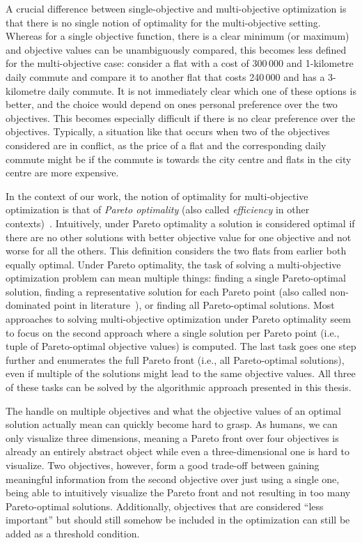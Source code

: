 A crucial difference between single-objective and multi-objective optimization is that there is no single notion of optimality for the multi-objective setting.
Whereas for a single objective function, there is a clear minimum (or maximum) and objective values can be unambiguously compared, this becomes less defined for the multi-objective case:
consider a flat with a cost of 300\,000 \texteuro{} and 1-kilometre daily commute and compare it to another flat that costs 240\,000 \texteuro{} and has a 3-kilometre daily commute.
It is not immediately clear which one of these options is better, and the choice would depend on ones personal preference over the two objectives.
This becomes especially difficult if there is no clear preference over the objectives.
Typically, a situation like that occurs when two of the objectives considered are in conflict, as the price of a flat and the corresponding daily commute might be if the commute is towards the city centre and flats in the city centre are more expensive.

In the context of our work, the notion of optimality for multi-objective optimization is that of \emph{Pareto optimality} (also called \emph{efficiency} in other contexts)~\autocite{Ehrgott2005-2}.
Intuitively, under Pareto optimality a solution is considered optimal if there are no other solutions with better objective value for one objective and not worse for all the others. 
This definition considers the two flats from earlier both equally optimal.
Under Pareto optimality, the task of solving a multi-objective optimization problem can mean multiple things:
finding a single Pareto-optimal solution, finding a representative solution for each Pareto point (also called non-dominated point in literature~\autocite{Ehrgott2005-2}), or finding all Pareto-optimal solutions.
Most approaches to solving multi-objective optimization under Pareto optimality seem to focus on the second approach where a single solution per Pareto point (i.e., tuple of Pareto-optimal objective values) is computed.
The last task goes one step further and enumerates the full Pareto front (i.e., all Pareto-optimal solutions), even if multiple of the solutions might lead to the same objective values.
All three of these tasks can be solved by the algorithmic approach presented in this thesis.

The handle on multiple objectives and what the objective values of an optimal solution actually mean can quickly become hard to grasp.
As humans, we can only visualize three dimensions, meaning a Pareto front over four objectives is already an entirely abstract object while even a three-dimensional one is hard to visualize.
Two objectives, however, form a good trade-off between gaining meaningful information from the second objective over just using a single one, being able to intuitively visualize the Pareto front and not resulting in too many Pareto-optimal solutions.
Additionally, objectives that are considered ``less important'' but should still somehow be included in the optimization can still be added as a threshold condition.

